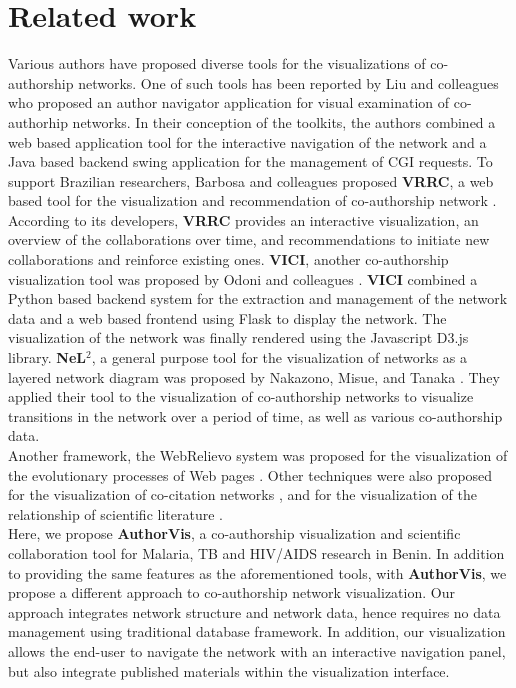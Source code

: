 \section{Related work}
Various authors have proposed diverse tools for the visualizations of co-authorship networks. One of such tools has been reported by Liu and colleagues \cite{liu_toolkits_2004} who proposed an author navigator application for visual examination of co-authorhip networks. In their conception of the toolkits, the authors combined a web based application tool for the interactive navigation of the network and a Java based backend swing application for the management of CGI requests. To support Brazilian researchers, Barbosa and colleagues proposed \textbf{VRRC}, a web based tool for the visualization and recommendation of co-authorship network \cite{barbosa_vrrc:_2012}. According to its developers, \textbf{VRRC} provides an interactive visualization, an overview of the collaborations over time, and recommendations to initiate new collaborations and reinforce existing ones. \textbf{VICI}, another co-authorship visualization tool was proposed by  Odoni and colleagues \cite{odoni_visualisation_2017}. \textbf{VICI} combined a Python based backend system for the extraction and management of the network data and a web based frontend using Flask \cite{grinberg_flask_2014} to display the network. The visualization of the network was finally rendered using the Javascript D3.js \cite{bostock_d3._2012} library. \textbf{NeL$^2$}, a general purpose tool for the visualization of networks as a layered network diagram was proposed by Nakazono, Misue, and Tanaka \cite{nakazono_nel_2006}. They applied their tool to the visualization of co-authorship networks to visualize transitions in the network over a period of time, as well as various co-authorship data. \\
Another framework, the WebRelievo system was proposed for the visualization of the evolutionary processes of Web pages \cite{toyoda_system_2005}. Other techniques were also proposed for the visualization of co-citation networks \cite{chen_visualizing_1999}, and for the visualization of the relationship of scientific literature \cite{erten_simultaneous_2005}. \\
Here, we propose \textbf{AuthorVis}, a co-authorship visualization and scientific collaboration tool for Malaria, TB and HIV/AIDS research in Benin. In addition to providing the same features as the aforementioned tools, with \textbf{AuthorVis}, we propose a different approach to co-authorship network visualization. Our approach integrates network structure and network data, hence requires no data management using traditional database framework. In addition, our visualization allows the end-user to navigate the network with an interactive navigation panel, but also integrate published materials within the visualization interface.

